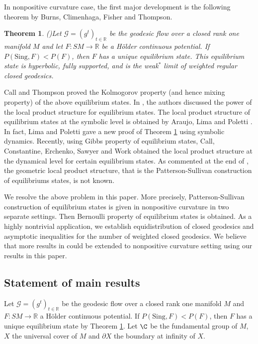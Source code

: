 \documentclass[11pt]{amsart}
\newtheorem{theorem}{Theorem}[section]
\theoremstyle{definition}
\def\CG{{\mathcal G}}
\def\pX{{\partial X}}
\def\RR{{\mathbb R}}
\begin{document}
In nonpositive curvature case, the first major development is the following theorem by Burns, Climenhaga, Fisher and Thompson.
\begin{theorem}(\cite[Theorem A]{BCFT})\label{bcft}
Let $\CG=(g^t)_{t\in \RR}$ be the geodesic flow over a closed rank one manifold $M$ and let $F: SM\to \RR$ be a H\"{o}lder continuous potential. If $P(\text{Sing}, F)< P(F)$, then $F$ has
a unique equilibrium state.  This equilibrium state is hyperbolic, fully supported, and is the weak$^*$ limit of weighted regular closed geodesics.
\end{theorem}

Call and Thompson \cite{CT} proved the Kolmogorov property (and hence mixing property) of the above equilibrium states. In \cite[Subsection 7.3]{CT}, the authors discussed the power of the local product structure for equilibrium states. The local product structure of equilibrium states at the symbolic level is obtained by Araujo, Lima and Poletti \cite{ALP}. In fact, Lima and Poletti \cite{LP} gave a new proof of Theorem \ref{bcft} using symbolic dynamics. Recently, using Gibbs property of equilibrium states, Call, Constantine, Erchenko, Sawyer and Work \cite[Theorem D]{CCESW} obtained the local product structure at the dynamical level for certain equilibrium states.  As commented at the end of \cite{CT}, the geometric local product structure, that is the Patterson-Sullivan construction of equilibriums states, is not known. 

We resolve the above problem in this paper. More precisely, Patterson-Sullivan construction of equilibrium states is given in nonpositive curvature in two separate settings. Then Bernoulli property of equilibrium states is obtained. As a highly nontrivial application, we establish equidistribution of closed geodesics and asymptotic inequalities for the number of weighted closed geodesics. We believe that more results in \cite{PPS} could be extended to nonpositive curvature setting using our results in this paper.

\subsection{Statement of main results}
Let $\CG=(g^t)_{t\in \RR}$ be the geodesic flow over a closed rank one manifold $M$ and $F: SM\to \RR$ a H\"{o}lder continuous potential. If $P(\text{Sing}, F)< P(F)$, then $F$ has
a unique equilibrium state by Theorem \ref{bcft}. Let $\C$ be the fundamental group of $M$,  $X$ the universal cover of $M$ and $\pX$ the boundary at infinity of $X$.
\end{document}
